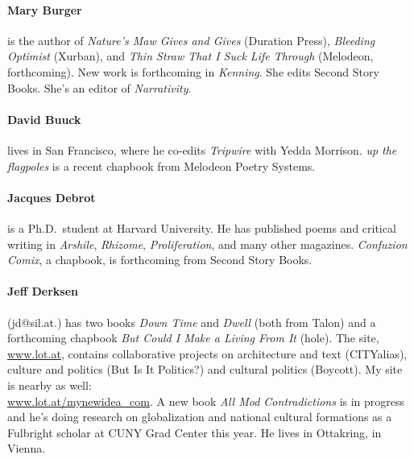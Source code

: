 \documentclass[
]{memoir}
\begin{document}
\hypertarget{mary-burger}{%
\paragraph{Mary Burger}\label{mary-burger}}

is the author of \emph{Nature's Maw Gives and Gives} (Duration Press),
\emph{Bleeding Optimist} (Xurban), and \emph{Thin Straw That I Suck Life
Through} (Melodeon, forthcoming). New work is forthcoming in
\emph{Kenning}. She edits Second Story Books. She's an editor of
\emph{Narrativity}.

\hypertarget{david-buuck}{%
\paragraph{David Buuck}\label{david-buuck}}

lives in San Francisco, where he co-edits \emph{Tripwire} with Yedda
Morrison. \emph{up the flagpoles} is a recent chapbook from Melodeon
Poetry Systems.

\hypertarget{jacques-debrot}{%
\paragraph{Jacques Debrot}\label{jacques-debrot}}

is a Ph.D.~student at Harvard University. He has published poems and
critical writing in \emph{Arshile}, \emph{Rhizome},
\emph{Proliferation}, and many other magazines. \emph{Confuzion Comix},
a chapbook, is forthcoming from Second Story Books.

\hypertarget{jeff-derksen}{%
\paragraph{Jeff Derksen}\label{jeff-derksen}}

(jd@sil.at.) has two books \emph{Down Time} and \emph{Dwell} (both from
Talon) and a forthcoming chapbook \emph{But Could I Make a Living From
It} (hole). The site, \url{www.lot.at}, contains collaborative projects
on architecture and text (CITYalias), culture and politics (But Is It
Politics?) and cultural politics (Boycott). My site is nearby as well:\\
\url{www.lot.at/mynewidea_com}. A new book \emph{All Mod Contradictions}
is in progress and he's doing research on globalization and national
cultural formations as a Fulbright scholar at CUNY Grad Center this
year. He lives in Ottakring, in Vienna.
\end{document}
